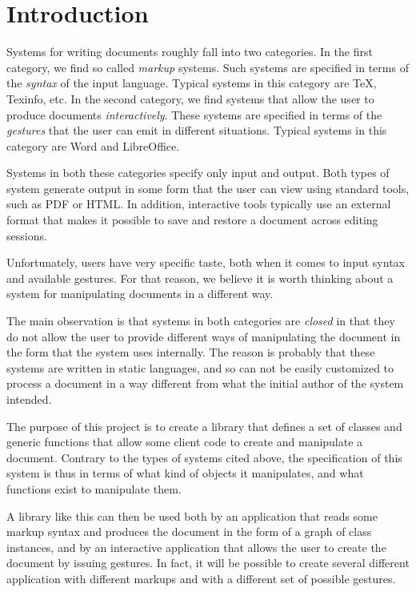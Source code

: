 \chapter{Introduction}
\setcounter{page}{1}%
%
\label{chap-introduction}%

Systems for writing documents roughly fall into two categories.  In
the first category, we find so called \emph{markup} systems.  Such
systems are specified in terms of the \emph{syntax} of the input
language.  Typical systems in this category are TeX, Texinfo, etc.  In
the second category, we find systems that allow the user to produce
documents \emph{interactively}.  These systems are specified in terms
of the \emph{gestures} that the user can emit in different situations.
Typical systems in this category are Word and LibreOffice.

Systems in both these categories specify only input and output.  Both
types of system generate output in some form that the user can view
using standard tools, such as PDF or HTML.  In addition, interactive
tools typically use an external format that makes it possible to save
and restore a document across editing sessions.

Unfortunately, users have very specific taste, both when it comes to
input syntax and available gestures.  For that reason, we believe it
is worth thinking about a system for manipulating documents in a
different way.

The main observation is that systems in both categories are
\emph{closed} in that they do not allow the user to provide different
ways of manipulating the document in the form that the system uses
internally.  The reason is probably that these systems are written in
static languages, and so can not be easily customized to process a
document in a way different from what the initial author of the system
intended.

The purpose of this project is to create a library that defines a set
of classes and generic functions that allow some client code to create
and manipulate a document.  Contrary to the types of systems cited
above, the specification of this system is thus in terms of what kind
of objects it manipulates, and what functions exist to manipulate
them.

A library like this can then be used both by an application that reads
some markup syntax and produces the document in the form of a graph of
class instances, and by an interactive application that allows the
user to create the document by issuing gestures.  In fact, it will be
possible to create several different application with different
markups and with a different set of possible gestures.

